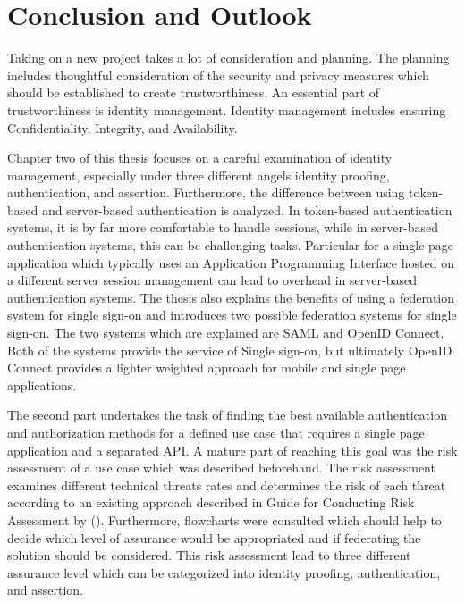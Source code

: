 \chapter{Conclusion and Outlook}\label{chap:conclusion}
\chapterstart

Taking on a new project takes a lot of consideration and planning. The planning includes thoughtful consideration of the security and privacy measures which should be established to create trustworthiness. An essential part of trustworthiness is identity management. Identity management includes ensuring Confidentiality, Integrity, and Availability. 

Chapter two of this thesis focuses on a careful examination of identity management, especially under three different angels identity proofing, authentication, and assertion. Furthermore, the difference between using token-based and server-based authentication is analyzed. In token-based authentication systems, it is by far more comfortable to handle sessions, while in server-based authentication systems, this can be challenging tasks. Particular for a single-page application which typically uses an Application Programming Interface hosted on a different server session management can lead to overhead in server-based authentication systems. The thesis also explains the benefits of using a federation system for single sign-on and introduces two possible federation systems for single sign-on. The two systems which are explained are SAML and OpenID Connect. Both of the systems provide the service of Single sign-on, but ultimately OpenID Connect provides a lighter weighted approach for mobile and single page applications. 

The second part undertakes the task of finding the best available authentication and authorization methods for a defined use case that requires a single page application and a separated API. A mature part of reaching this goal was the risk assessment of a use case which was described beforehand. The risk assessment examines different technical threats rates and determines the risk of each threat according to an existing approach described in Guide for Conducting Risk Assessment by (\cite{NIST:2012:GCRA}). Furthermore, flowcharts were consulted which should help to decide which level of assurance would be appropriated and if federating the solution should be considered. This risk assessment lead to three different assurance level which can be categorized into identity proofing, authentication, and assertion. 

